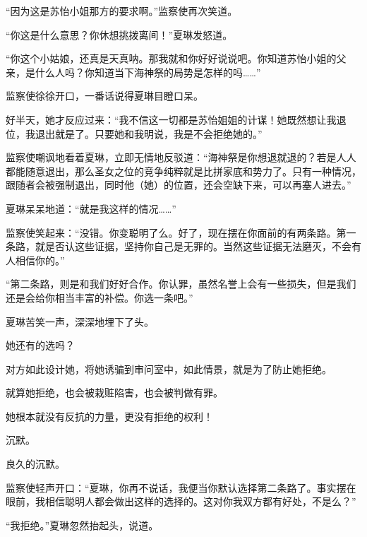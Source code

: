 \begin{this_body}
“因为这是苏怡小姐那方的要求啊。”监察使再次笑道。

“你这是什么意思？你休想挑拨离间！”夏琳发怒道。

“你这个小姑娘，还真是天真呐。那我就和你好好说说吧。你知道苏怡小姐的父亲，是什么人吗？你知道当下海神祭的局势是怎样的吗……”

监察使徐徐开口，一番话说得夏琳目瞪口呆。

好半天，她才反应过来：“我不信这一切都是苏怡姐姐的计谋！她既然想让我退位，我退出就是了。只要她和我明说，我是不会拒绝她的。”

监察使嘲讽地看着夏琳，立即无情地反驳道：“海神祭是你想退就退的？若是人人都能随意退出，那么圣女之位的竞争纯粹就是比拼家底和势力了。只有一种情况，跟随者会被强制退出，同时他（她）的位置，还会空缺下来，可以再塞人进去。”

夏琳呆呆地道：“就是我这样的情况……”

监察使笑起来：“没错。你变聪明了么。好了，现在摆在你面前的有两条路。第一条路，就是否认这些证据，坚持你自己是无罪的。当然这些证据无法磨灭，不会有人相信你的。”

“第二条路，则是和我们好好合作。你认罪，虽然名誉上会有一些损失，但是我们还是会给你相当丰富的补偿。你选一条吧。”

夏琳苦笑一声，深深地埋下了头。

她还有的选吗？

对方如此设计她，将她诱骗到审问室中，如此情景，就是为了防止她拒绝。

就算她拒绝，也会被栽赃陷害，也会被判做有罪。

她根本就没有反抗的力量，更没有拒绝的权利！

沉默。

良久的沉默。

监察使轻声开口：“夏琳，你再不说话，我便当你默认选择第二条路了。事实摆在眼前，我相信聪明人都会做出这样的选择的。这对你我双方都有好处，不是么？”

“我拒绝。”夏琳忽然抬起头，说道。

\end{this_body}

